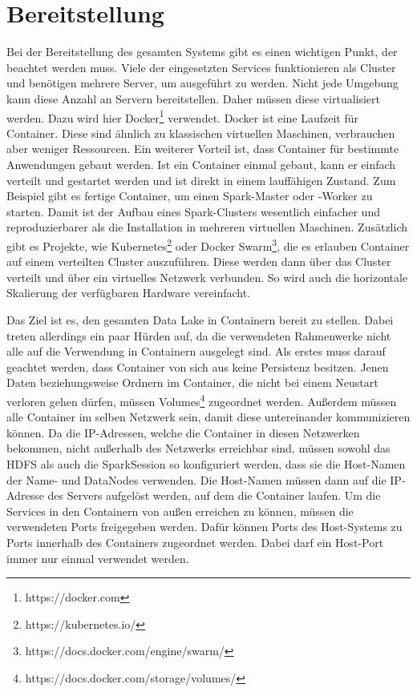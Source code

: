 \section{Bereitstellung}

Bei der Bereitstellung des gesamten Systems gibt es einen wichtigen Punkt, der beachtet werden muss.
Viele der eingesetzten Services funktionieren als Cluster und benötigen mehrere Server, um ausgeführt zu werden.
Nicht jede Umgebung kann diese Anzahl an Servern bereitstellen.
Daher müssen diese virtualisiert werden.
Dazu wird hier Docker\footnote{https://docker.com} verwendet.
Docker ist eine Laufzeit für Container.
Diese sind ähnlich zu klassischen virtuellen Maschinen, verbrauchen aber weniger Ressourcen.
Ein weiterer Vorteil ist, dass Container für bestimmte Anwendungen gebaut werden.
Ist ein Container einmal gebaut, kann er einfach verteilt und gestartet werden und ist direkt in einem lauffähigen Zustand.
Zum Beispiel gibt es fertige Container, um einen Spark-Master oder -Worker zu starten.
Damit ist der Aufbau eines Spark-Clusters wesentlich einfacher und reproduzierbarer als die Installation in mehreren virtuellen Maschinen.
Zusätzlich gibt es Projekte, wie Kubernetes\footnote{https://kubernetes.io/} oder Docker Swarm\footnote{https://docs.docker.com/engine/swarm/}, die es erlauben Container auf einem verteilten Cluster auszuführen.
Diese werden dann über das Cluster verteilt und über ein virtuelles Netzwerk verbunden.
So wird auch die horizontale Skalierung der verfügbaren Hardware vereinfacht.

Das Ziel ist es, den gesamten Data Lake in Containern bereit zu stellen.
Dabei treten allerdings ein paar Hürden auf, da die verwendeten Rahmenwerke nicht alle auf die Verwendung in Containern ausgelegt sind.
Als erstes muss darauf geachtet werden, dass Container von sich aus keine Persistenz besitzen.
Jenen Daten beziehungsweise Ordnern im Container, die nicht bei einem Neustart verloren gehen dürfen, müssen Volumes\footnote{https://docs.docker.com/storage/volumes/} zugeordnet werden.
Außerdem müssen alle Container im selben Netzwerk sein, damit diese untereinander kommunizieren können.
Da die IP-Adressen, welche die Container in diesen Netzwerken bekommen, nicht außerhalb des Netzwerks erreichbar sind, müssen sowohl das HDFS als auch die SparkSession so konfiguriert werden, dass sie die Host-Namen der Name- und DataNodes verwenden.
Die Host-Namen müssen dann auf die IP-Adresse des Servers aufgelöst werden, auf dem die Container laufen.
Um die Services in den Containern von außen erreichen zu können, müssen die verwendeten Ports freigegeben werden.
Dafür können Ports des Host-Systems zu Ports innerhalb des Containers zugeordnet werden.
Dabei darf ein Host-Port immer nur einmal verwendet werden.

